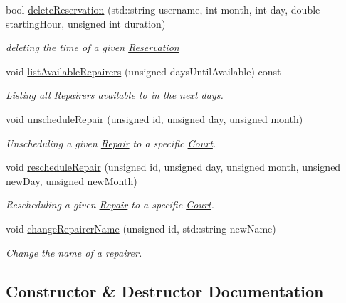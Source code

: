 \begin{DoxyCompactItemize}
$$bool \mbox{\hyperlink{class_company_ad6819fd8a928fd10123ad24ca640325c}{delete\+Reservation}} (std\+::string username, int month, int day, double starting\+Hour, unsigned int duration)
\begin{DoxyCompactList}\small\item\em deleting the time of a given \mbox{\hyperlink{class_reservation}{Reservation}} \end{DoxyCompactList}\item 
void \mbox{\hyperlink{class_company_a12366416c26ae1d5046695261374f440}{list\+Available\+Repairers}} (unsigned days\+Until\+Available) const
\begin{DoxyCompactList}\small\item\em Listing all Repairers available to in the next days. \end{DoxyCompactList}\item 
void \mbox{\hyperlink{class_company_a64817eefb5be8a9d23af9e0f651b7f71}{unschedule\+Repair}} (unsigned id, unsigned day, unsigned month)
\begin{DoxyCompactList}\small\item\em Unscheduling a given \mbox{\hyperlink{class_repair}{Repair}} to a specific \mbox{\hyperlink{class_court}{Court}}. \end{DoxyCompactList}\item 
void \mbox{\hyperlink{class_company_aaab5975d45b94e576be7fe6b8d0e73e5}{reschedule\+Repair}} (unsigned id, unsigned day, unsigned month, unsigned new\+Day, unsigned new\+Month)
\begin{DoxyCompactList}\small\item\em Rescheduling a given \mbox{\hyperlink{class_repair}{Repair}} to a specific \mbox{\hyperlink{class_court}{Court}}. \end{DoxyCompactList}\item 
void \mbox{\hyperlink{class_company_af3c6fb096e7983f540bdb993852fa47b}{change\+Repairer\+Name}} (unsigned id, std\+::string new\+Name)
\begin{DoxyCompactList}\small\item\em Change the name of a repairer. \end{DoxyCompactList}\end{DoxyCompactItemize}


\subsection{Constructor \& Destructor Documentation}
\mbox{\label{class_company_ac038a4c5e02f13a7bab9b5139990316e}} 
